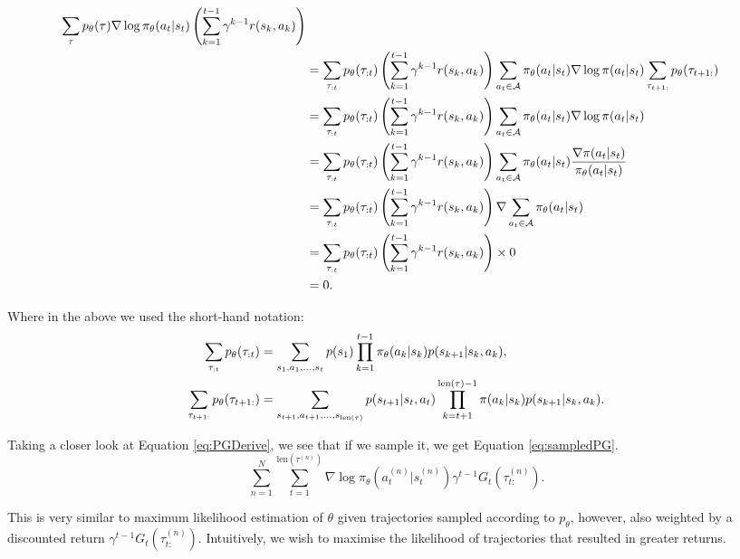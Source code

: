 \documentclass{report}
\numberwithin{equation}{section}
\numberwithin{figure}{section}
\numberwithin{table}{section}
\numberwithin{algorithm}{section}
\begin{document}
\begin{align}\label{eq:dropPrevRews}
  \sum_{\tau}p_\theta(\tau)\nabla \log \pi_\theta(a_t|s_t)
  \left(
    \sum_{k=1}^{t-1}\gamma^{k-1}r(s_k, a_k)
  \right)\notag\\
  &=\sum_{\tau_{:t}}p_\theta(\tau_{:t})\left(
    \sum_{k=1}^{t-1}\gamma^{k-1}r(s_k, a_k)
  \right)\sum_{a_t\in\mathcal{A}}\pi_\theta(a_t|s_t)
  \nabla \log \pi(a_t|s_t)\sum_{\tau_{t+1:}}p_\theta(\tau_{t+1:})\notag\\
  &=\sum_{\tau_{:t}}p_\theta(\tau_{:t})\left(
    \sum_{k=1}^{t-1}\gamma^{k-1}r(s_k, a_k)
  \right)\sum_{a_t\in\mathcal{A}}\pi_\theta(a_t|s_t)
  \nabla \log \pi(a_t|s_t)\notag\\
  &=\sum_{\tau_{:t}}p_\theta(\tau_{:t})\left(
    \sum_{k=1}^{t-1}\gamma^{k-1}r(s_k, a_k)
  \right)\sum_{a_t\in\mathcal{A}}\pi_\theta(a_t|s_t)\frac{\nabla\pi(a_t|s_t)}{\pi_\theta(a_t|s_t)}\notag\\
  &=\sum_{\tau_{:t}}p_\theta(\tau_{:t})\left(
    \sum_{k=1}^{t-1}\gamma^{k-1}r(s_k, a_k)
  \right)\nabla\sum_{a_t\in\mathcal{A}}\pi_\theta(a_t|s_t)\notag\\
  &=\sum_{\tau_{:t}}p_\theta(\tau_{:t})\left(
    \sum_{k=1}^{t-1}\gamma^{k-1}r(s_k, a_k)
  \right)\times 0\notag\\
  &=0.
\end{align}

Where in the above we used the short-hand notation:
\begin{align*}
  \sum_{\tau_{:t}}p_\theta(\tau_{:t})&=\sum_{s_1,a_1,\ldots,s_t}p(s_1)\prod_{k=1}^{t-1}\pi_\theta(a_k|s_k)p(s_{k+1}|s_k,a_k),\notag\\
  \sum_{\tau_{t+1:}}p_\theta(\tau_{t+1:})&=\sum_{s_{t+1}, a_{t+1},\ldots,s_{\text{len}(\tau)}}p(s_{t+1}|s_t,a_t)\prod_{k=t+1}^{\text{len}(\tau)-1}\pi(a_k|s_k)p(s_{k+1}|s_k,a_k).
\end{align*}

Taking a closer look at Equation \ref{eq:PGDerive}, we see that 
if we sample it, we get Equation \ref{eq:sampledPG}.
\begin{equation}\label{eq:sampledPG}
  \sum_{n=1}^N
    \sum_{t=1}^{\text{len}(\tau^{(n)})}\nabla \log \pi_\theta(a_t^{(n)}|s_t^{(n)})
  \gamma^{t-1}G_t(\tau_{t:}^{(n)}).
\end{equation}

This is very similar to maximum likelihood estimation of $\theta$ 
given trajectories sampled according to $p_\theta$, however, 
also weighted by a discounted return $\gamma^{t-1}G_t(\tau_{t:}^{(n)})$.
Intuitively, we wish to maximise the likelihood of trajectories 
that resulted in greater returns.
\end{document}
